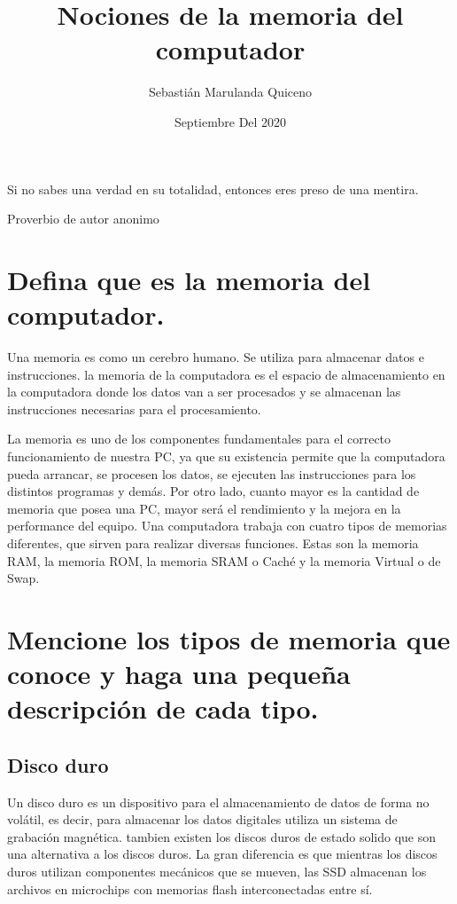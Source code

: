 \documentclass[a4paper]{article}
\title{Nociones de la memoria del computador}
\author{Sebastián Marulanda Quiceno}
\date{Septiembre Del 2020}
\begin{document}
\maketitle

\epigraph{Si no sabes una verdad en su totalidad, entonces eres preso de una mentira.}{Proverbio de autor anonimo}


\section{Defina que es la memoria del computador.}

Una memoria es como un cerebro humano. Se utiliza para almacenar datos e instrucciones. la memoria de la computadora es el espacio de almacenamiento en la computadora donde los datos van a ser procesados y se almacenan las instrucciones necesarias para el procesamiento. 

La memoria es uno de los componentes fundamentales para el correcto funcionamiento de nuestra PC, ya que su existencia permite que la computadora pueda arrancar, se procesen los datos, se ejecuten las instrucciones para los distintos programas y demás. Por otro lado, cuanto mayor es la cantidad de memoria que posea una PC, mayor será el rendimiento y la mejora en la performance del equipo. Una computadora trabaja con cuatro tipos de memorias diferentes, que sirven para realizar diversas funciones. Estas son la memoria RAM, la memoria ROM, la memoria SRAM o Caché y la memoria Virtual o de Swap.


\section{Mencione los tipos de memoria que conoce y haga una pequeña descripción de cada tipo.}
\label{sec:examples}

\subsection{Disco duro}

Un disco duro es un dispositivo para el almacenamiento de datos de forma no volátil, es decir, para almacenar los datos digitales utiliza un sistema de grabación magnética. tambien existen los discos duros de estado solido que son una alternativa a los discos duros. La gran diferencia es que mientras los discos duros utilizan componentes mecánicos que se mueven, las SSD almacenan los archivos en microchips con memorias flash interconectadas entre sí.
\end{document}
